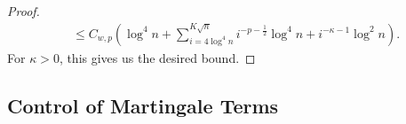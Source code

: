 \documentclass[twoside,12pt, a4paper, final]{article}
\numberwithin{equation}{section}
\theoremstyle{remark}
\begin{document}
\begin{proof}
\begin{align*}
			&\le C_{w, p} \left(\log^4 n + \sum_{i = 4 \log^4 n}^{K \sqrt{n} } i^{- p - \frac{1}{2}} \log^4 n + i^{- \kappa - 1 } \log^2 n \right)
			.\end{align*} 
		For $\kappa>0$, this gives us the desired bound.
	\end{proof}
	
	
	\subsection{Control of Martingale Terms } 
\end{document}
